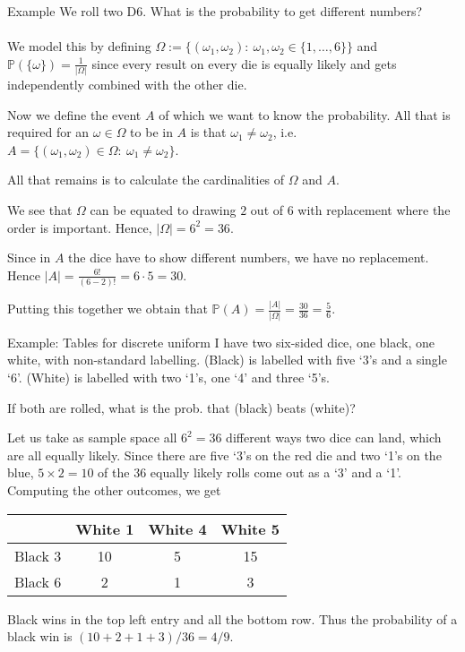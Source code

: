 \documentclass[11pt,pdf,ngerman,UKenglish,handout]{beamer}%
\newcommand{\IP}{\mathbb{P}}
\newcommand{\1}{\mathbb{1}}
\theoremstyle{thm}
\theoremstyle{def}
\begin{document}
\begin{frame}{Example}
We roll two D6. What is the probability to get different numbers?
\\ \ \\
\pause
We model this by defining $\Omega:= \{ (\omega_1,\omega_2):\ \omega_1,\omega_2 \in \{1,\ldots,6\} \}$ and $\IP(\{\omega\})=\frac{1}{\vert \Omega \vert}$ since every result on every die is equally likely and gets independently combined with the other die.

\pause
Now we define the event $A$ of which we want to know the probability. All that is required for an $\omega \in \Omega$ to be in $A$ is that $\omega_1 \neq \omega_2$, i.e.\ $A= \{ (\omega_1,\omega_2) \in \Omega:\ \omega_1 \neq \omega_2 \}$. 

All that remains is to calculate the cardinalities of $\Omega$ and $A$.

\pause
We see that $\Omega$ can be equated to drawing $2$ out of $6$ with replacement where the order is important. Hence, $\vert \Omega \vert = 6^2 = 36$.

Since in $A$ the dice have to show different numbers, we have no replacement. Hence $\vert A \vert = \frac{6!}{(6-2)!}= 6 \cdot 5=30$. 

Putting this together we obtain that $\IP(A) = \frac{\vert A \vert}{\vert \Omega \vert} = \frac{30}{36}=\frac{5}{6}$.
\vfill
\end{frame}


\begin{frame}{Example: Tables for discrete uniform}
I have two six-sided dice, one black, one white, with non-standard labelling. (Black) is labelled with five `3's and a single `6'.  (White) is labelled with two `1's, one `4' and three `5's.

If both are rolled, what is the prob. that (black) beats (white)?
\vspace*{2mm}

\pause
Let us take as sample space all $6^2=36$ different ways two dice can land, which are all equally likely.  Since there are five `3's on the red die and two `1's on the blue,  $5 \times 2 = 10$ of the 36 equally likely rolls come out as a `3' and a `1'.  Computing the other outcomes, we get 
\begin{center}
\begin{tabular}{|c|ccc|}
 \hline 
   & White 1 & White 4 &  White 5 \\ 
  \hline
 Black 3 & 10 & 5 & 15   \\
 Black 6 & 2 & 1  & 3  \\
 \hline
\end{tabular}
\end{center}
Black wins in the top left entry and all the bottom row.  Thus the probability of a black win is $(10+2+1+3)/36 = 4/9$. 
\end{frame}
\end{document}
